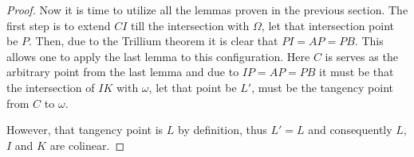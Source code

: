 \documentclass{article}
\begin{document}
\begin{proof}
Now it is time to utilize all the lemmas proven in the previous section. The first step is to extend \(CI\) till the intersection with \(\Omega\), let that intersection point be \(P\). Then, due to the Trillium theorem it is clear that \(PI = AP = PB\). This allows one to apply the last lemma to this configuration. Here \(C\) is serves as the arbitrary point from the last lemma and due to \(IP = AP = PB\) it must be that the intersection of \(IK\) with \(\omega\), let that point be \(L'\), must be the tangency point from \(C\) to \(\omega\). 

\begin{center}
    \centering
\end{center}

However, that tangency point is \(L\) by definition, thus \(L' = L\) and consequently \(L\), \(I\) and \(K\) are colinear.

\end{proof}
\end{document}

